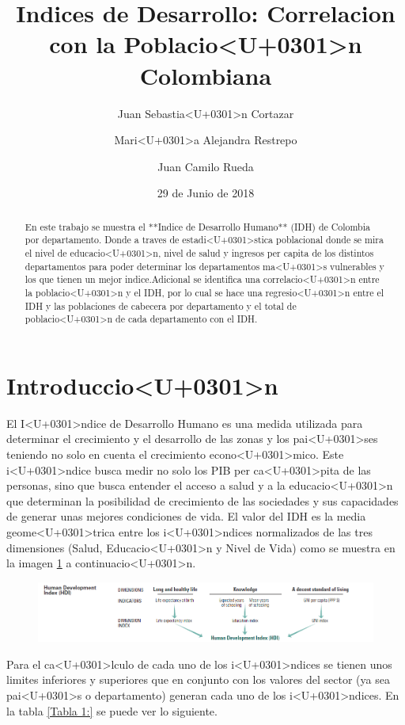 \documentclass{article}
\title{Indices de Desarrollo: Correlacion con la Poblacio<U+0301>n Colombiana}
\author[1]{\normalsize Juan Sebastia<U+0301>n Cortazar}
\author[2]{\normalsize Mari<U+0301>a Alejandra Restrepo}
\author[3]{\normalsize Juan Camilo Rueda}
\affil[1,2,3]{\small  Universidad de los Andes\\
\texttt{{js.cortazar533,ma.restrepot,jc.rueda169}@uniandes.edu.col}}
\date{29 de Junio de 2018}
\begin{document}


\maketitle


\begin{abstract}
En este trabajo se muestra el **Indice de Desarrollo Humano** (IDH) de Colombia por departamento. Donde a traves de estadi<U+0301>stica poblacional donde se mira el nivel de educacio<U+0301>n, nivel de salud y ingresos per capita de los distintos departamentos para poder determinar los departamentos ma<U+0301>s vulnerables y los que tienen un mejor indice.Adicional se identifica una correlacio<U+0301>n entre la poblacio<U+0301>n y el IDH, por lo cual se hace una regresio<U+0301>n entre el IDH y las poblaciones de cabecera por departamento y el total de poblacio<U+0301>n de cada departamento con el IDH. 
\end{abstract}

\section*{Introduccio<U+0301>n}

El I<U+0301>ndice de Desarrollo Humano es una medida utilizada para determinar el crecimiento y el desarrollo de las zonas y los pai<U+0301>ses teniendo no solo en cuenta el crecimiento econo<U+0301>mico. Este i<U+0301>ndice busca medir no solo los PIB per ca<U+0301>pita de las personas, sino que busca entender el acceso a salud y a la educacio<U+0301>n que determinan la posibilidad de crecimiento de las sociedades y sus capacidades de generar unas mejores condiciones de vida. 
El valor del IDH es la media geome<U+0301>trica entre los i<U+0301>ndices normalizados de las tres dimensiones (Salud, Educacio<U+0301>n y Nivel de Vida) como se muestra en la imagen \ref{IDH} a continuacio<U+0301>n. 


\begin{figure}[h]
\centering
\includegraphics{hdiCalc}
\label {IDH}
\end{figure}

Para el ca<U+0301>lculo de cada uno de los i<U+0301>ndices se tienen unos limites inferiores y superiores que en conjunto con los valores del sector (ya sea pai<U+0301>s o departamento) generan cada uno de los i<U+0301>ndices. En la tabla \ref{Tabla 1:} se puede ver lo siguiente.
\end{document}

